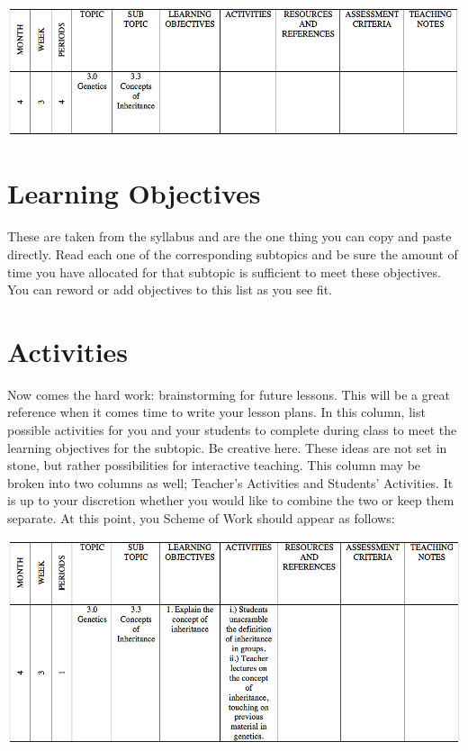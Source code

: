 \begin{flushleft}
\includegraphics[scale=.4]{./img/picture-2.png} 
\end{flushleft}

\section{Learning Objectives}
These are taken from the syllabus and are the one thing you can copy and paste directly.  Read each one of the corresponding subtopics and be sure the amount of time you have allocated for that subtopic is sufficient to meet these objectives.  You can reword or add objectives to this list as you see fit.

\section{Activities}
Now comes the hard work: brainstorming for future lessons.  This will be a great reference when it comes time to write your lesson plans.  In this column, list possible activities for you and your students to complete during class to meet the learning objectives for the subtopic.  Be creative here.  These ideas are not set in stone, but rather possibilities for interactive teaching.  This column may be broken into two columns as well; Teacher's Activities and Students' Activities. It is up to your discretion whether you would like to combine the two or keep them separate. At this point, you Scheme of Work should appear as follows:

\begin{flushleft}
\includegraphics[scale=.4]{./img/picture-3.png} 
\end{flushleft}


